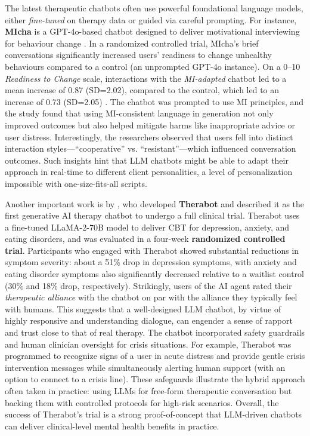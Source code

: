 The latest therapeutic chatbots often use powerful foundational language models, either \emph{fine-tuned} on therapy data or guided via careful prompting. For instance, \textbf{MIcha} is a GPT-4o-based chatbot designed to deliver motivational interviewing for behaviour change \cite{Meyer2025}. In a randomized controlled trial, MIcha’s brief conversations significantly increased users’ readiness to change unhealthy behaviours compared to a control (an unprompted GPT-4o instance). On a 0–10 \emph{Readiness to Change} \cite{BienerAbrams1991} scale, interactions with the \emph{MI-adapted} chatbot led to a mean increase of 0.87 (SD=2.02), compared to the control, which led to an increase of 0.73 (SD=2.05) \cite{Meyer2025}.
The chatbot was prompted to use MI principles, and the study found that using MI-consistent language in generation not only improved outcomes but also helped mitigate harms like inappropriate advice or user distress. Interestingly, the researchers observed that users fell into distinct interaction styles—“cooperative” vs. “resistant”—which influenced conversation outcomes. Such insights hint that LLM chatbots might be able to adapt their approach in real-time to different client personalities, a level of personalization impossible with one-size-fits-all scripts.

Another important work is by \citet{doi:10.1056/AIoa2400802}, who developed \textbf{Therabot} and described it as the first generative AI therapy chatbot to undergo a full clinical trial. Therabot uses a fine-tuned LLaMA-2-70B model to deliver CBT for depression, anxiety, and eating disorders, and was evaluated in a four-week \textbf{randomized controlled trial}. Participants who engaged with Therabot showed substantial reductions in symptom severity: about a 51\% drop in depression symptoms, with anxiety and eating disorder symptoms also significantly decreased relative to a waitlist control (30\% and 18\% drop, respectively). Strikingly, users of the AI agent rated their \emph{therapeutic alliance} with the chatbot on par with the alliance they typically feel with humans. This suggests that a well-designed LLM chatbot, by virtue of highly responsive and understanding dialogue, can engender a sense of rapport and trust close to that of real therapy. The chatbot incorporated safety guardrails and human clinician oversight for crisis situations. For example, Therabot was programmed to recognize signs of a user in acute distress and provide gentle crisis intervention messages while simultaneously alerting human support (with an option to connect to a crisis line). These safeguards illustrate the hybrid approach often taken in practice: using LLMs for free-form therapeutic conversation but backing them with controlled protocols for high-risk scenarios. Overall, the success of Therabot’s trial is a strong proof-of-concept that LLM-driven chatbots can deliver clinical-level mental health benefits in practice.

